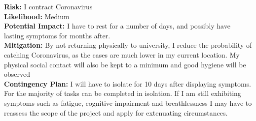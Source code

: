 \noindent \textbf{Risk:} I contract Coronavirus\\
\textbf{Likelihood:} Medium\\
\textbf{Potential Impact:} I have to rest for a number of days, and possibly
have lasting symptoms for months after. \cite{Sudre2020LongCorona}\\
\textbf{Mitigation:} By not returning physically to university, I reduce the
probability of catching Coronavirus, as the cases are much lower in my current
location. My physical social contact will also be kept to a minimum and good hygiene
will be observed\\
\textbf{Contingency Plan:} I will have to isolate for 10 days after displaying
symptoms. For the majority of tasks can be completed in isolation. If I am still
exhibiting symptoms such as fatigue, cognitive impairment and breathlessness I may
have to reassess the scope of the project and apply for extenuating circumstances.\par







